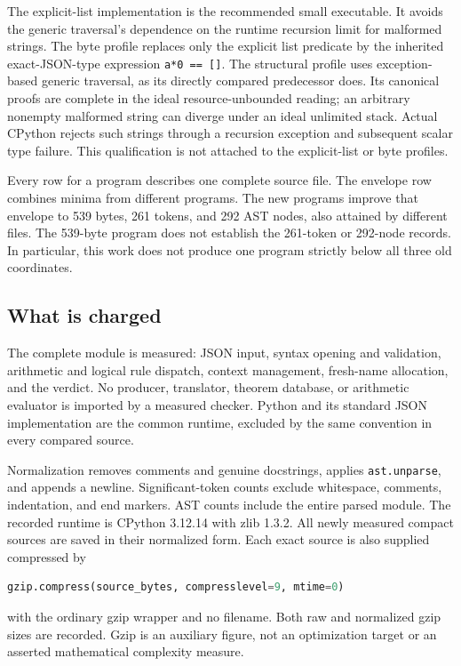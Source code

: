 \documentclass[11pt,letterpaper]{article}
\theoremstyle{definition}\newtheorem{definition}[theorem]{Definition}
\theoremstyle{remark}\newtheorem{remark}[theorem]{Remark}
\begin{document}
The explicit-list implementation is the recommended small executable.
It avoids the generic traversal's dependence on the runtime recursion
limit for malformed strings. The byte profile replaces only the explicit
list predicate by the inherited exact-JSON-type expression
\texttt{a*0 == []}. The structural profile uses exception-based generic
traversal, as its directly compared predecessor does. Its canonical
proofs are complete in the ideal resource-unbounded reading; an arbitrary
nonempty malformed string can diverge under an ideal unlimited stack.
Actual CPython rejects such strings through a recursion exception and
subsequent scalar type failure. This qualification is not attached to
the explicit-list or byte profiles.

Every row for a program describes one complete source file. The envelope
row combines minima from different programs. The new programs improve
that envelope to 539 bytes, 261 tokens, and 292 AST nodes, also attained
by different files. The 539-byte program does not establish the 261-token
or 292-node records. In particular, this work does not produce one
program strictly below all three old coordinates.

\subsection{What is charged}

The complete module is measured: JSON input, syntax opening and
validation, arithmetic and logical rule dispatch, context management,
fresh-name allocation, and the verdict. No producer, translator, theorem
database, or arithmetic evaluator is imported by a measured checker.
Python and its standard JSON implementation are the common runtime,
excluded by the same convention in every compared source.

Normalization removes comments and genuine docstrings, applies
\texttt{ast.unparse}, and appends a newline. Significant-token counts
exclude whitespace, comments, indentation, and end markers. AST counts
include the entire parsed module. The recorded runtime is CPython
3.12.14 with zlib 1.3.2. All newly measured compact sources are saved in
their normalized form. Each exact source is also supplied compressed by
\begin{lstlisting}[language=Python]
gzip.compress(source_bytes, compresslevel=9, mtime=0)
\end{lstlisting}
with the ordinary gzip wrapper and no filename. Both raw and normalized
gzip sizes are recorded. Gzip is an auxiliary figure, not an optimization
target or an asserted mathematical complexity measure.
\end{document}
